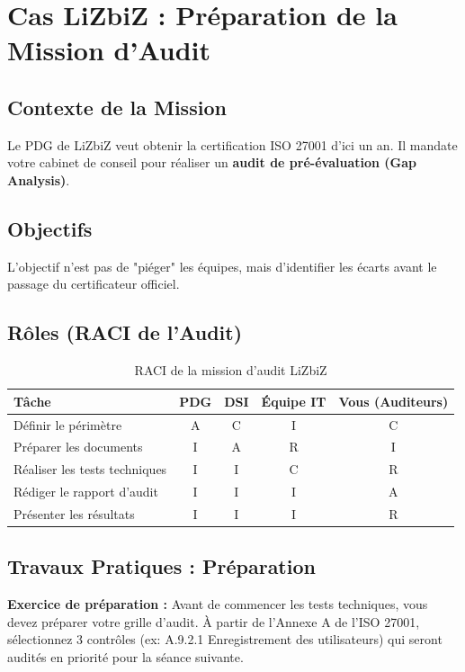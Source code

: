 \section{Cas LiZbiZ : Préparation de la Mission d'Audit}

\subsection{Contexte de la Mission}

Le PDG de LiZbiZ veut obtenir la certification ISO 27001 d'ici un an. Il mandate votre cabinet de conseil pour réaliser un \textbf{audit de pré-évaluation (Gap Analysis)}.

\subsection{Objectifs}

L'objectif n'est pas de "piéger" les équipes, mais d'identifier les écarts avant le passage du certificateur officiel.

\subsection{Rôles (RACI de l'Audit)}

\begin{table}[htbp]
\centering
\begin{tabular}{lcccc}
    \toprule
    \textbf{Tâche} & \textbf{PDG} & \textbf{DSI} & \textbf{Équipe IT} & \textbf{Vous (Auditeurs)} \\
    \midrule
    Définir le périmètre & A & C & I & C \\
    Préparer les documents & I & A & R & I \\
    Réaliser les tests techniques & I & I & C & R \\
    Rédiger le rapport d'audit & I & I & I & A \\
    Présenter les résultats & I & I & I & R \\
    \bottomrule
\end{tabular}
\caption{RACI de la mission d'audit LiZbiZ}
\end{table}

\subsection{Travaux Pratiques : Préparation}

\begin{boxlizbiz}
\textbf{Exercice de préparation :}
Avant de commencer les tests techniques, vous devez préparer votre grille d'audit.
À partir de l'Annexe A de l'ISO 27001, sélectionnez 3 contrôles (ex: A.9.2.1 Enregistrement des utilisateurs) qui seront audités en priorité pour la séance suivante.
\end{boxlizbiz}

